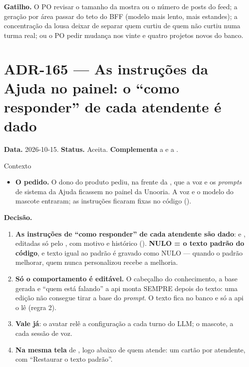 \textbf{Gatilho.} O PO revisar o tamanho da mostra ou o número de posts do
feed; a geração por área passar do teto do BFF (modelo mais lento, mais
estandes); a concentração da lousa deixar de separar quem curtiu de quem não
curtiu numa turma real; ou o PO pedir mudança nos vinte e quatro projetos novos
do banco.

\section{ADR-165 --- As instruções da Ajuda no painel: o \enquote{como responder} de cada atendente é dado}
\label{adr:ajuda-instrucoes-no-painel}

\textbf{Data.} 2026-10-15. \textbf{Status.} Aceita. \textbf{Complementa} a
 e a .

\begin{especificacao}{Contexto}
\begin{itemize}
  \item \textbf{O pedido.} O dono do produto pediu, na frente da
    , que a voz e os \emph{prompts} de sistema da Ajuda ficassem
    no painel da Unooria. A voz e o modelo do mascote entraram; as instruções
    ficaram fixas no código ().
\end{itemize}
\end{especificacao}

\textbf{Decisão.}

\begin{enumerate}
  \item \textbf{As instruções de \enquote{como responder} de cada atendente são
    dado}:  e
    , editadas só pelo , com motivo e
    histórico (). \textbf{NULO = o texto padrão do
    código}, e texto igual ao padrão é gravado como NULO --- quando o padrão
    melhorar, quem nunca personalizou recebe a melhoria.
  \item \textbf{Só o comportamento é editável.} O cabeçalho do conhecimento, a
    base gerada e \enquote{quem está falando} a api monta SEMPRE depois do texto:
    uma edição não consegue tirar a base do \emph{prompt}. O texto fica no
    banco e só a api o lê (regra 2).
  \item \textbf{Vale já}: o avatar relê a configuração a cada turno do LLM; o
    mascote, a cada sessão de voz.
  \item \textbf{Na mesma tela} de , logo abaixo de
    quem atende: um cartão por atendente, com \enquote{Restaurar o texto
    padrão}.
\end{enumerate}

